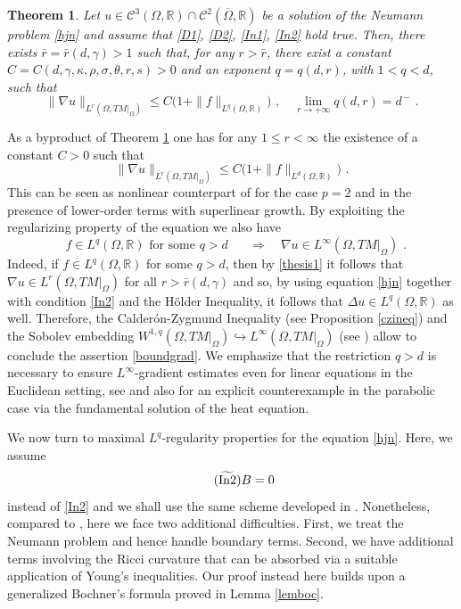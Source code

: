 \documentclass[10pt, a4paper, reqno, oneside]{amsart}
\theoremstyle{plain}
\theoremstyle{definition}
\theoremstyle{plain}
\newtheorem{theorem}[theo]{Theorem}
\theoremstyle{definition}
\theoremstyle{plain}
\renewcommand{\=}{:=}
\begin{document}
\begin{theorem} \label{main1}
Let $u \in \mathcal{C}^3(\Omega,\mathbb{R}) \cap \mathcal{C}^2(\overline{\Omega},\mathbb{R})$ be a solution of the Neumann problem \eqref{hjn} and assume that \eqref{D1}, \eqref{D2}, \eqref{In1}, \eqref{In2} hold true.
Then, there exists $\bar{r}=\bar{r}(d,\gamma)>1$ such that, for any $r>\bar{r}$, there exist a constant $C=C(d,\gamma,\kappa,\rho,\sigma,\theta,r,s)>0$ and an exponent $q=q(d,r)$, with $1 < q < d$, such that
\begin{equation} \label{thesis1}
\|\nabla u\|_{L^r(\Omega,TM|_{\Omega})}\leq C\big(1+\|f\|_{L^q(\Omega,\mathbb{R})}\big) \,\, , \quad \lim_{r \to +\infty}q(d,r) = d^{\,-} \,\, .
\end{equation}
\end{theorem}
As a byproduct of Theorem \ref{main1} one has for any $1 \leq r<\infty$ the existence of a constant $C>0$ such that 
$$
\|\nabla u\|_{L^r(\Omega,TM|_{\Omega})}\leq C\big(1+\|f\|_{L^d(\Omega,\mathbb{R})}\big) \,\, .
$$
This can be seen as nonlinear counterpart of \cite{CMjems} for the case $p=2$ and in the presence of lower-order terms with superlinear growth.
By exploiting the regularizing property of the equation we also have
\begin{equation} \label{boundgrad}
\text{ $f \in L^q(\Omega,\mathbb{R})$ for some $q>d$ } \quad \Longrightarrow \quad \nabla u \in L^\infty(\Omega,TM|_{\Omega}) \,\, .
\end{equation}
Indeed, if $f \in L^q(\Omega,\mathbb{R})$ for some $q>d$, then by \eqref{thesis1} it follows that $\nabla u \in L^r(\Omega,TM|_{\Omega})$ for all $r > \bar{r}(d,\gamma)$ and so, by using equation \eqref{hjn} together with condition \eqref{In2} and the H{\"o}lder Inequality, it follows that $\Delta u \in L^q(\Omega,\mathbb{R})$ as well. Therefore, the Calder\'on-Zygmund Inequality (see Proposition \ref{czineq}) and the Sobolev embedding $W^{1,q}(\Omega,TM|_{\Omega}) \hookrightarrow L^{\infty}(\Omega,TM|_{\Omega})$ (see \cite[Chapter 10]{HebeyBook}) allow to conclude the assertion \eqref{boundgrad}. We emphasize that the restriction $q>d$ is necessary to ensure $L^{\infty}$-gradient estimates even for linear equations in the Euclidean setting, see \cite{KMBull} and also \cite{CG2} for an explicit counterexample in the parabolic case via the fundamental solution of the heat equation. \smallskip


We now turn to maximal $L^q$-regularity properties for the equation \eqref{hjn}. Here, we assume
\begin{equation} \label{tildeIn2} \tag{$\widetilde{{\rm In}2}$}
B = 0
\end{equation}
instead of \eqref{In2} and we shall use the same scheme developed in \cite{CGell}. Nonetheless, compared to \cite{CGell}, here we face two additional difficulties. First, we treat the Neumann problem and hence handle boundary terms. Second, we have additional terms involving the Ricci curvature that can be absorbed via a suitable application of Young's inequalities. Our proof instead here builds upon a generalized Bochner's formula proved in Lemma \ref{lemboc}.
\end{document}
